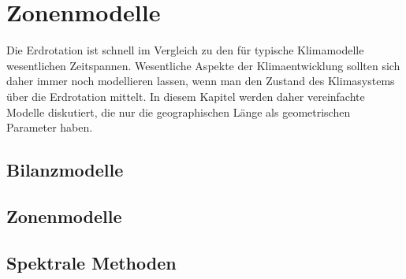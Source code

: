 %
%
%
\chapter{Zonenmodelle}
Die Erdrotation ist schnell im Vergleich zu den für typische Klimamodelle
wesentlichen Zeitspannen.
Wesentliche Aspekte der Klimaentwicklung sollten sich daher immer
noch modellieren lassen, wenn man den Zustand des Klimasystems über
die Erdrotation mittelt.
In diesem Kapitel werden daher vereinfachte Modelle diskutiert,
die nur die geographischen Länge als geometrischen Parameter haben.

\section{Bilanzmodelle}

\section{Zonenmodelle}

\section{Spektrale Methoden}

